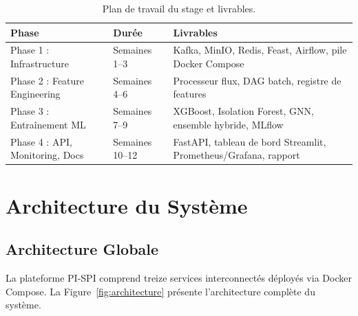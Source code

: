 \documentclass[12pt,a4paper,oneside]{book}
\theoremstyle{definition}
\theoremstyle{plain}
\begin{document}
\begin{table}[H]
  \centering
  \caption{Plan de travail du stage et livrables.}
  \label{tab:workplan}
  \begin{tabularx}{\linewidth}{llX}
    \toprule
    \textbf{Phase} & \textbf{Durée} & \textbf{Livrables} \\
    \midrule
    Phase 1 : Infrastructure   & Semaines 1--3  & Kafka, MinIO, Redis, Feast, Airflow, pile Docker Compose \\
    Phase 2 : Feature Engineering & Semaines 4--6  & Processeur flux, DAG batch, registre de features \\
    Phase 3 : Entraînement ML  & Semaines 7--9  & XGBoost, Isolation Forest, GNN, ensemble hybride, MLflow \\
    Phase 4 : API, Monitoring, Docs & Semaines 10--12 & FastAPI, tableau de bord Streamlit, Prometheus/Grafana, rapport \\
    \bottomrule
  \end{tabularx}
\end{table}

\section{Architecture du Système}

\subsection{Architecture Globale}

La plateforme PI-SPI comprend treize services interconnectés déployés via Docker Compose. La Figure~\ref{fig:architecture} présente l'architecture complète du système.
\end{document}
